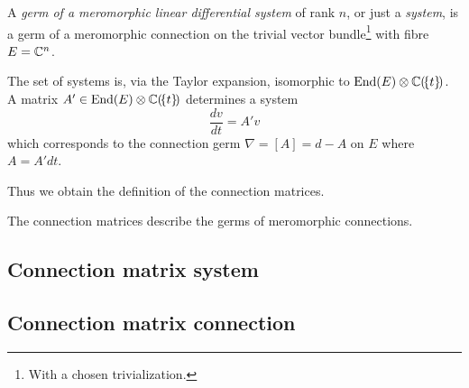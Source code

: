 \begin{comment}
  Some Literature like \cite{sabbah_cimpa90} always talks about germs\dots
\end{comment}
\begin{defn}
  A \emph{germ of a meromorphic linear differential system} of rank $n$, or
  just a \emph{system}, is a germ of a meromorphic connection on the trivial
  vector bundle\footnote{With a chosen trivialization.} with fibre $E=\mathbb{C}^n$.
\end{defn}
The set of systems is, via the Taylor expansion, isomorphic to
$\operatorname{End}(E)\otimes\mathbb{C}(\!\{t\}\!)$. A matrix
$A'\in\operatorname{End}(E)\otimes\mathbb{C}(\!\{t\}\!)$ determines a system
\[
  \frac{dv}{dt}=A'v
\]
which corresponds to the connection germ $\nabla=[A]=d-A$ on $E$ where
$A=A'dt$.
\begin{paracol}{2}\sloppy
\switchcolumn[1]\noindent
  Thus we obtain the definition of the connection matrices.
\end{paracol}
\begin{comment}
  \cite{boalch} wants \textbf{generic} meromorphic connections
  \begin{itemize}
    \item\dots simplest jet sufficient\dots
  \end{itemize}
\end{comment}

\begin{comment}
  \TODO[Gauge transformation]
  \begin{itemize}
    \item meromorphic transformation \cite{Loday1994} p. 852
    \item holomorphic trasformation
  \end{itemize}
\end{comment}

\begin{cor}
  The connection matrices describe the germs of meromorphic connections.
\end{cor}

\subsection{Connection matrix \leftrightarrow{} system}
\subsection{Connection matrix \rightarrow{} connection}
\begin{comment}
  There is a thm in \cite{sabbah2007isomonodromic}
\end{comment}


